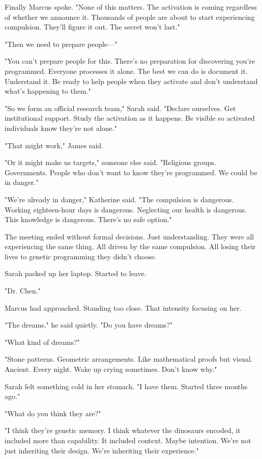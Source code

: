 Finally Marcus spoke. "None of this matters. The activation is coming regardless of whether we announce it. Thousands of people are about to start experiencing compulsion. They'll figure it out. The secret won't last."

"Then we need to prepare people—"

"You can't prepare people for this. There's no preparation for discovering you're programmed. Everyone processes it alone. The best we can do is document it. Understand it. Be ready to help people when they activate and don't understand what's happening to them."

"So we form an official research team," Sarah said. "Declare ourselves. Get institutional support. Study the activation as it happens. Be visible so activated individuals know they're not alone."

"That might work," James said.

"Or it might make us targets," someone else said. "Religious groups. Governments. People who don't want to know they're programmed. We could be in danger."

"We're already in danger," Katherine said. "The compulsion is dangerous. Working eighteen-hour days is dangerous. Neglecting our health is dangerous. This knowledge is dangerous. There's no safe option."

The meeting ended without formal decisions. Just understanding. They were all experiencing the same thing. All driven by the same compulsion. All losing their lives to genetic programming they didn't choose.

Sarah packed up her laptop. Started to leave.

"Dr. Chen."

Marcus had approached. Standing too close. That intensity focusing on her.

"The dreams," he said quietly. "Do you have dreams?"

"What kind of dreams?"

"Stone patterns. Geometric arrangements. Like mathematical proofs but visual. Ancient. Every night. Wake up crying sometimes. Don't know why."

Sarah felt something cold in her stomach. "I have them. Started three months ago."

"What do you think they are?"

"I think they're genetic memory. I think whatever the dinosaurs encoded, it included more than capability. It included context. Maybe intention. We're not just inheriting their design. We're inheriting their experience."

